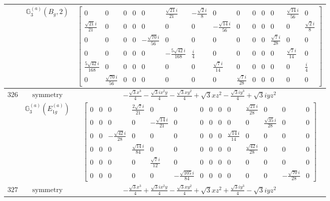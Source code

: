 \documentclass[fleqn,8pt,landscape]{jsarticle}
\begin{document}
\begin{longtable}{ccc}
$  $ & $ \mathbb{G}_{3}^{(a)}(B_{g},2) $ & $ \begin{bmatrix} 0 & 0 & 0 & 0 & 0 & \frac{\sqrt{21} i}{21} & - \frac{\sqrt{2} i}{8} & 0 & 0 & 0 & 0 & 0 & \frac{\sqrt{14} i}{56} & 0 \\ \frac{\sqrt{21} i}{21} & 0 & 0 & 0 & 0 & 0 & 0 & - \frac{\sqrt{14} i}{56} & 0 & 0 & 0 & 0 & 0 & \frac{\sqrt{2} i}{8} \\ 0 & 0 & 0 & 0 & - \frac{\sqrt{70} i}{56} & 0 & 0 & 0 & 0 & 0 & 0 & \frac{\sqrt{7} i}{28} & 0 & 0 \\ 0 & 0 & 0 & 0 & 0 & - \frac{5 \sqrt{42} i}{168} & \frac{i}{4} & 0 & 0 & 0 & 0 & 0 & \frac{\sqrt{7} i}{14} & 0 \\ \frac{5 \sqrt{42} i}{168} & 0 & 0 & 0 & 0 & 0 & 0 & \frac{\sqrt{7} i}{14} & 0 & 0 & 0 & 0 & 0 & \frac{i}{4} \\ 0 & \frac{\sqrt{70} i}{56} & 0 & 0 & 0 & 0 & 0 & 0 & \frac{\sqrt{7} i}{28} & 0 & 0 & 0 & 0 & 0 \end{bmatrix} $ \\ \hline
$ 326 $ & $ \text{symmetry} $ & $ - \frac{\sqrt{3} x^{3}}{4} - \frac{\sqrt{3} i x^{2} y}{4} - \frac{\sqrt{3} x y^{2}}{4} + \sqrt{3} x z^{2} - \frac{\sqrt{3} i y^{3}}{4} + \sqrt{3} i y z^{2} $ \\
$  $ & $ \mathbb{G}_{3}^{(a)}(E_{1g}^{(a)}) $ & $ \begin{bmatrix} 0 & 0 & 0 & \frac{2 \sqrt{7} i}{21} & 0 & 0 & 0 & 0 & 0 & 0 & \frac{\sqrt{21} i}{28} & 0 & 0 & 0 \\ 0 & 0 & 0 & 0 & - \frac{\sqrt{14} i}{21} & 0 & 0 & 0 & 0 & 0 & 0 & \frac{\sqrt{35} i}{28} & 0 & 0 \\ 0 & 0 & - \frac{\sqrt{42} i}{28} & 0 & 0 & 0 & 0 & 0 & 0 & \frac{\sqrt{14} i}{14} & 0 & 0 & 0 & 0 \\ 0 & 0 & 0 & \frac{\sqrt{14} i}{84} & 0 & 0 & 0 & 0 & 0 & 0 & \frac{\sqrt{42} i}{28} & 0 & 0 & 0 \\ 0 & 0 & 0 & 0 & \frac{\sqrt{7} i}{12} & 0 & 0 & 0 & 0 & 0 & 0 & 0 & 0 & 0 \\ 0 & 0 & 0 & 0 & 0 & - \frac{\sqrt{105} i}{84} & 0 & 0 & 0 & 0 & 0 & 0 & - \frac{\sqrt{70} i}{28} & 0 \end{bmatrix} $ \\ \hline
$ 327 $ & $ \text{symmetry} $ & $ - \frac{\sqrt{3} x^{3}}{4} + \frac{\sqrt{3} i x^{2} y}{4} - \frac{\sqrt{3} x y^{2}}{4} + \sqrt{3} x z^{2} + \frac{\sqrt{3} i y^{3}}{4} - \sqrt{3} i y z^{2} $ \\

\end{longtable}
\end{document}
